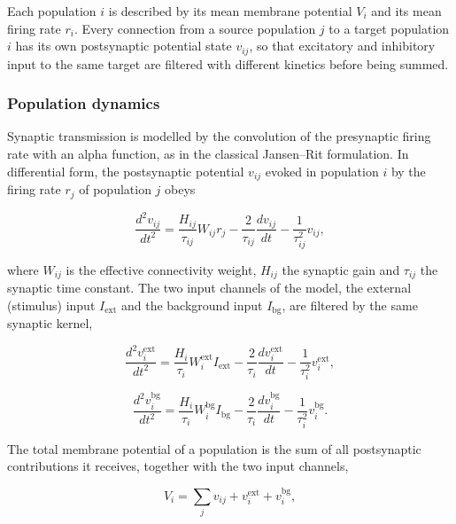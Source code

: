 \documentclass[11pt,a4paper,onecolumn]{article}
\begin{document}
Each population $i$ is described by its mean membrane potential $V_i$ and its mean firing rate $r_i$. Every connection from a source population $j$ to a target population $i$ has its own postsynaptic potential state $v_{ij}$, so that excitatory and inhibitory input to the same target are filtered with different kinetics before being summed.

\subsubsection*{Population dynamics}
\vspace{-7pt}

Synaptic transmission is modelled by the convolution of the presynaptic firing rate with an alpha function, as in the classical Jansen--Rit formulation. In differential form, the postsynaptic potential $v_{ij}$ evoked in population $i$ by the firing rate $r_j$ of population $j$ obeys

\begin{equation}
\label{eq:psp}
\frac{d^2 v_{ij}}{dt^2}
=
\frac{H_{ij}}{\tau_{ij}}W_{ij}r_j
-\frac{2}{\tau_{ij}}\frac{dv_{ij}}{dt}
-\frac{1}{\tau_{ij}^2}v_{ij},
\end{equation}

where $W_{ij}$ is the effective connectivity weight, $H_{ij}$ the synaptic gain and $\tau_{ij}$ the synaptic time constant. The two input channels of the model, the external (stimulus) input $I_{\mathrm{ext}}$ and the background input $I_{\mathrm{bg}}$, are filtered by the same synaptic kernel,

\begin{equation}
\label{eq:ext}
\frac{d^2 v_i^{\mathrm{ext}}}{dt^2}
=
\frac{H_i}{\tau_i}W_i^{\mathrm{ext}}I_{\mathrm{ext}}
-\frac{2}{\tau_i}\frac{dv_i^{\mathrm{ext}}}{dt}
-\frac{1}{\tau_i^2}v_i^{\mathrm{ext}},
\end{equation}

\begin{equation}
\label{eq:bg}
\frac{d^2 v_i^{\mathrm{bg}}}{dt^2}
=
\frac{H_i}{\tau_i}W_i^{\mathrm{bg}}I_{\mathrm{bg}}
-\frac{2}{\tau_i}\frac{dv_i^{\mathrm{bg}}}{dt}
-\frac{1}{\tau_i^2}v_i^{\mathrm{bg}}.
\end{equation}

The total membrane potential of a population is the sum of all postsynaptic contributions it receives, together with the two input channels,

\begin{equation}
\label{eq:vtotal}
V_i=\sum_j v_{ij}+v_i^{\mathrm{ext}}+v_i^{\mathrm{bg}},
\end{equation}
\end{document}
